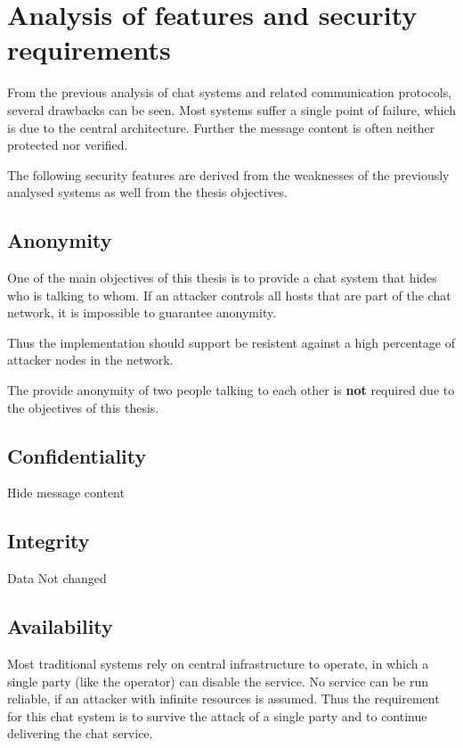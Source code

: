 \chapter{Analysis of features and security requirements}
\label{requirements}
From the previous analysis of chat systems and related communication protocols,
several drawbacks can be seen. Most systems suffer a single point of failure,
which is due to the central architecture. Further the message content is often
neither protected nor verified.

The following security features are derived from the weaknesses of the previously
analysed systems as well from the thesis objectives.
\section{Anonymity}
One of the main objectives of this thesis is to provide a chat system that
hides who is talking to whom. If an attacker controls all hosts that are
part of the chat network, it is impossible to guarantee anonymity.

Thus the implementation should support be resistent against a high percentage
of attacker nodes in the network.

The provide anonymity of two people talking to each other is \textbf{not} 
required due to the objectives of this thesis.
\section{Confidentiality}
Hide message content

% 
\section{Integrity}
Data Not changed
\section{Availability}
Most traditional systems rely on central infrastructure to operate, in which a
single party (like the operator) can disable the service. 
No service can be run reliable, if an attacker with infinite resources is assumed.
Thus the requirement for this chat system is to survive the attack of a single
party and to continue delivering the chat service.
